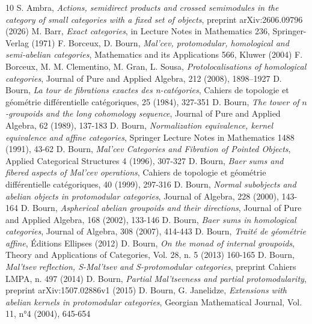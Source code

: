 \documentclass[11pt]{amsart}
\theoremstyle{plain}
\theoremstyle{definition}
\theoremstyle{remark}
\begin{document}
\begin{thebibliography}{10}
 S. Ambra, \emph{Actions, semidirect products and crossed semimodules in the category of small categories with a fixed set of objects}, preprint arXiv:2606.09796 (2026)
 M. Barr, \emph{Exact categories}, in Lecture Notes in Mathematics 236, Springer-Verlag (1971)
 F. Borceux, D. Bourn, \emph{Mal'cev, protomodular, homological and semi-abelian categories}, Mathematics and its Applications 566, Kluwer (2004)
 F. Borceux, M. M. Clementino, M. Gran, L. Sousa, \emph{Protolocalisations of homological categories}, Journal of Pure and Applied Algebra, 212 (2008), 1898–1927
 D. Bourn, \emph{La tour de fibrations exactes des n-catégories}, Cahiers de topologie et géométrie différentielle catégoriques, 25 (1984), 327-351
 D. Bourn, \emph{The tower of }$n$\emph{-groupoids and the long cohomology sequence}, Journal of Pure and Applied Algebra, 62 (1989), 137-183
 D. Bourn, \emph{Normalization equivalence, kernel equivalence and affine categories}, Springer Lecture Notes in Mathematics 1488 (1991), 43-62
 D. Bourn, \emph{Mal'cev Categories and Fibration of Pointed Objects}, Applied Categorical Structures 4 (1996), 307-327
 D. Bourn, \emph{Baer sums and fibered aspects of Mal'cev operations}, Cahiers de topologie et géométrie différentielle catégoriques, 40 (1999), 297-316
 D. Bourn, \emph{Normal subobjects and abelian objects in protomodular categories}, Journal of Algebra, 228 (2000), 143-164
 D. Bourn, \emph{Aspherical abelian groupoids and their directions}, Journal of Pure and Applied Algebra, 168 (2002), 133-146
 D. Bourn, \emph{Baer sums in homological categories}, Journal of Algebra, 308 (2007), 414-443
 D. Bourn, \emph{Traité de géométrie affine}, Éditions Ellipses (2012)
 D. Bourn, \emph{On the monad of internal groupoids}, Theory and Applications of Categories, Vol. 28, n. 5 (2013) 160-165
 D. Bourn, \emph{Mal'tsev reflection, S-Mal'tsev and S-protomodular categories}, preprint  Cahiers LMPA, n. 497 (2014)
 D. Bourn, \emph{Partial Mal’tsevness and partial protomodularity}, preprint arXiv:1507.02886v1
(2015)
 D. Bourn, G. Janelidze, \emph{Extensions with abelian kernels in protomodular categories}, Georgian Mathematical Journal, Vol. 11, n°4 (2004), 645-654

\end{thebibliography}
\end{document}
